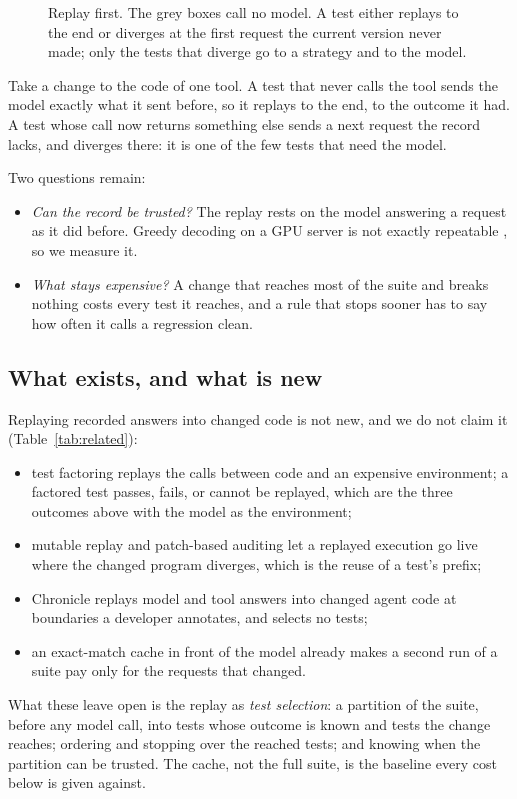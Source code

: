 \documentclass[11pt,a4paper]{article}
\begin{document}
\begin{figure}[!htbp]
  \centering
  \resizebox{\textwidth}{!}{}
  \caption{Replay first. The grey boxes call no model. A test either replays to the end or diverges at the first
  request the current version never made; only the tests that diverge go to a strategy and to the model.}
  \label{fig:replay}
\end{figure}

Take a change to the code of one tool. A test that never calls the tool sends the model exactly what it sent
before, so it replays to the end, to the outcome it had. A test whose call now returns something else sends a next
request the record lacks, and diverges there: it is one of the few tests that need the model.

Two questions remain:
\begin{itemize}
  \item \emph{Can the record be trusted?} The replay rests on the model answering a request as it did before.
        Greedy decoding on a GPU server is not exactly repeatable \cite{yuan2025numerical}, so we measure it.
  \item \emph{What stays expensive?} A change that reaches most of the suite and breaks nothing costs every test
        it reaches, and a rule that stops sooner has to say how often it calls a regression clean.
\end{itemize}

\subsection{What exists, and what is new}

Replaying recorded answers into changed code is not new, and we do not claim it (Table~\ref{tab:related}):
\begin{itemize}
  \item test factoring \cite{saff2005factoring} replays the calls between code and an expensive environment; a
        factored test passes, fails, or cannot be replayed, which are the three outcomes above with the model as
        the environment;
  \item mutable replay and patch-based auditing \cite{viennot2013dora,kim2012poirot} let a replayed execution go
        live where the changed program diverges, which is the reuse of a test's prefix;
  \item Chronicle \cite{chawla2026chronicle} replays model and tool answers into changed agent code at boundaries
        a developer annotates, and selects no tests;
  \item an exact-match cache in front of the model already makes a second run of a suite pay only for the
        requests that changed.
\end{itemize}
What these leave open is the replay as \emph{test selection}: a partition of the suite, before any model call, into
tests whose outcome is known and tests the change reaches; ordering and stopping over the reached tests; and
knowing when the partition can be trusted. The cache, not the full suite, is the baseline every cost below is
given against.
\end{document}
